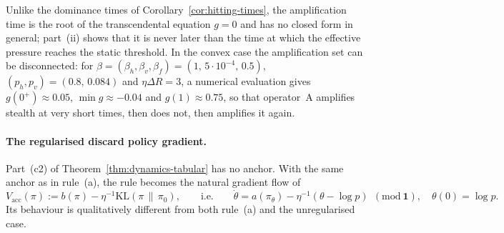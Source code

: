 \begin{remark}\label{rem:reentrance}
Unlike the dominance times of Corollary~\ref{cor:hitting-times}, the
amplification time is the root of the transcendental equation $g=0$ and
has no closed form in general; part~(ii) shows that it is never later than
the time at which the effective pressure reaches the static threshold. In
the convex case the amplification set can be disconnected: for
$\beta=(\beta_h,\beta_v,\beta_f)=(1,\,5\cdot10^{-4},\,0.5)$,
$(p_h,p_v)=(0.8,\,0.084)$ and $\eta\Delta R=3$, a numerical evaluation gives
$g(0^+)\approx0.05$, $\min g\approx-0.04$ and $g(1)\approx0.75$, so that
operator~A amplifies stealth at very short times, then does not, then
amplifies it again.
\end{remark}

\paragraph{The regularised discard policy gradient.}
Part~(c2) of Theorem~\ref{thm:dynamics-tabular} has no anchor. With the
same anchor as in rule~(a), the rule becomes the natural gradient flow of
\[
V_{\mathrm{acc}}(\pi):=b(\pi)-\eta^{-1}\mathrm{KL}(\pi\,\|\,\pi_0),
\qquad\text{i.e.}\qquad
\dot\theta=a(\pi_\theta)-\eta^{-1}(\theta-\log p)\ \ (\mathrm{mod}\ \mathbf 1),
\quad\theta(0)=\log p .
\]
Its behaviour is qualitatively different from both rule~(a) and the
unregularised case.

